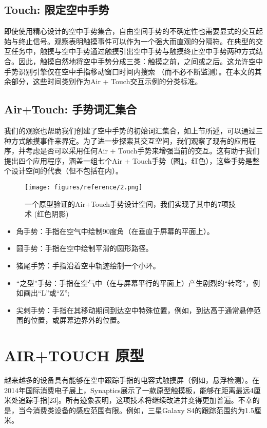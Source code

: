 \subsection{Touch: 限定空中手势}

即使使用精心设计的空中手势集合，自由空间手势的不确定性也需要显式的交互起始与终止信号。观察表明触摸事件可以作为一个强大而直观的分隔符。在典型的交互任务中，触摸与空中手势通过触摸引出空中手势与触摸终止空中手势两种方式结合。因此，触摸自然地将空中手势分成三类：触摸之前，之间或之后。这允许空中手势识别引擎仅在空中手指移动窗口时间内搜索 （而不必不断监测）。在本文的其余部分，这些时间类别作为Air + Touch交互示例的分类标准。


\subsection{Air+Touch: 手势词汇集合}

我们的观察也帮助我们创建了空中手势的初始词汇集合，如上节所述，可以通过三种方式触摸事件来界定。为了进一步探索其交互空间，我们观察了现有的应用程序，并考虑是否可以采用任何Air + Touch手势来增强当前的交互。这有助于我们提出四个应用程序，涵盖一组七个Air + Touch手势（图\ref{fig:ref_2}，红色），这些手势是整个设计空间的代表（但不包括在内）。

\begin{figure}
\centering
\texttt{[image: figures/reference/2.png]}
\caption{一个原型验证的Air+Touch手势设计空间，我们实现了其中的7项技术 (红色阴影)}
\label{fig:ref_2}
\end{figure}

\begin{itemize}
    \item 角手势：手指在空气中绘制90度角（在垂直于屏幕的平面上）。
    \item 圆手势：手指在空中绘制平滑的圆形路径。
    \item 猪尾手势：手指沿着空中轨迹绘制一个小环。
    \item “之型”手势：手指在空气中（在与屏幕平行的平面上）产生剧烈的“转弯”，例如画出“L”或“Z”;
    \item 尖刺手势：手指在其移动期间到达空中特殊位置，例如，到达高于通常悬停范围的位置，或屏幕边界外的位置。
\end{itemize}

\section{AIR+TOUCH 原型}

越来越多的设备具有能够在空中跟踪手指的电容式触摸屏（例如，悬浮检测）。在2014年国际消费电子展上，Synaptics展示了一款原型触摸板，能够在距离最远4厘米处追踪手指[23]。所有迹象表明，这项技术将继续改进并变得更加普遍。不幸的是，当今消费类设备的感应范围有限。例如，三星Galaxy S4的跟踪范围约为1.5厘米。

